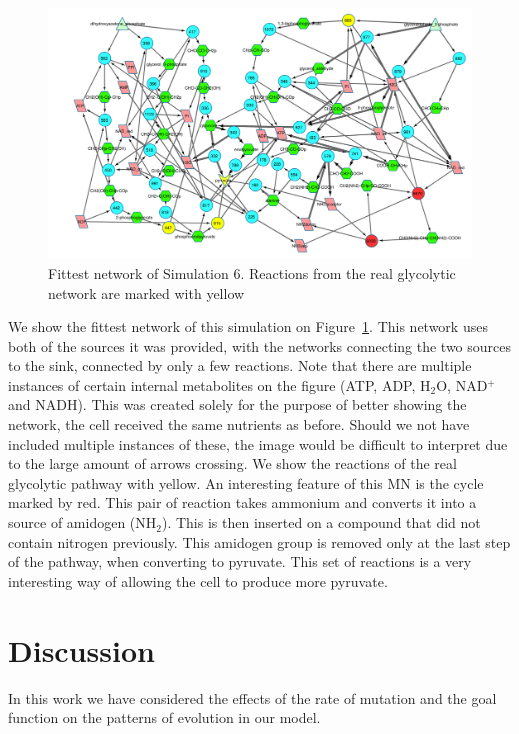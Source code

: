 \documentclass[a4paper,12pt]{article}
\begin{document}
\begin{figure}[htpb]
	\centering
	\includegraphics[width=1\linewidth]{sim6network.pdf}
	\caption{Fittest network of Simulation 6. Reactions from the real glycolytic network are marked with yellow}
	\label{fig:sim6network}
\end{figure}

We show the fittest network of this simulation on Figure~\ref{fig:sim6network}. This network uses both of the sources it was provided, with the networks connecting the two sources to the sink, connected by only a few reactions. Note that there are multiple instances of certain internal metabolites on the figure (ATP, ADP, H$_2$O, NAD$^+$ and NADH). This was created solely for the purpose of better showing the network, the cell received the same nutrients as before. Should we not have included multiple instances of these, the image would be difficult to interpret due to the large amount of arrows crossing. We show the reactions of the real glycolytic pathway with yellow. An interesting feature of this MN is the cycle marked by red. This pair of reaction takes ammonium and converts it into a source of amidogen (NH$_2$). This is then inserted on a compound that did not contain nitrogen previously. This amidogen group is removed only at the last step of the pathway, when converting to pyruvate. This set of reactions is a very interesting way of allowing the cell to produce more pyruvate. 


\section{Discussion}
\label{sec:discussion}

In this work we have considered the effects of the rate of mutation and the goal function on the patterns of evolution in our model. 
\end{document}
